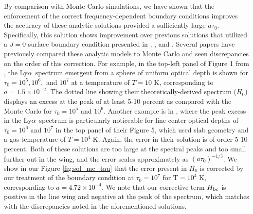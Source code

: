 \documentclass[linenumbers]{aastex63}
\newcommand\lya{Ly$\alpha$\ }
\begin{document}
By comparison with Monte Carlo simulations, we have shown that the enforcement of the correct frequency-dependent boundary conditions improves the accuracy of these analytic solutions provided a sufficiently large $a\tau_0$. Specifically, this solution shows improvement over previous solutions that utilized a $J=0$ surface boundary condition presented in \citet{1973MNRAS.162...43H}, \citet{1990ApJ...350..216N}, and \citet{2006ApJ...649...14D}. Several papers have previously compared these analytic models to Monte Carlo and seen discrepancies on the order of this correction. For example, in the top-left panel of Figure 1 from \citet{2006ApJ...649...14D}, the \lya spectrum emergent from a sphere of uniform optical depth is shown for $\tau_0=10^5, 10^6,$ and $10^7$ at a temperature of $T=10$ K, corresponding to $a=1.5 \times 10^{-2}$. The dotted line showing their theoretically-derived spectrum ($H_0$) displays an excess at the peak of at least 5-10 percent as compared with the Monte Carlo for $\tau_0=10^5$ and $10^6$. Another example is in \citet{2015MNRAS.449.4336S}, where the peak excess in the \lya spectrum is particularly noticeable for line center optical depths of $\tau_0=10^6$ and $10^7$ in the top panel of their Figure 5, which used slab geometry and a gas temperature of $T=10^4$ K. Again, the error in their solution is of order 5-10 percent. Both of these solutions are too large at the spectral peaks and too small further out in the wing, and the error scales approximately as $(a\tau_0)^{-1/3}$. We show in our Figure \ref{fig:sol_mc_tau} that the error present in $H_0$ is corrected by our treatment of the boundary condition at $\tau_0 = 10^7$ for T$=10^4$ K, corresponding to $a=4.72 \times 10^{-4}$. We note that our corrective term $H_{\rm bc}$ is positive in the line wing and negative at the peak of the spectrum, which matches with the discrepancies noted in the aforementioned solutions.
\end{document}
